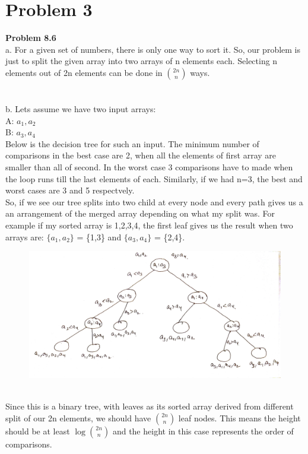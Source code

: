 \documentclass[10pt]{article}
\begin{document}
\section{Problem 3}
\textbf{Problem 8.6}\\
a. For a given set of numbers, there is only one way to sort it. So, our problem is just to split the given array into two arrays of n elements each. Selecting n elements out of 2n elements can be done in $2n\choose n$ ways.\\\\\\
b. Lets assume we have two input arrays: \\
A: $a_{1}, a_{2}$\\
B: $a_{3}, a_{4}$\\
Below is the decision tree for such an input. The minimum number of comparisons in the best case are 2, when all the elements of first array are smaller than all of second. In the worst case 3 comparisons have to made when the loop runs till the last elements of each. 
Similarly, if we had n=3, the best and worst cases are 3 and 5 respectvely.\\
So, if we see our tree splits into two child at every node and every path gives us a an arrangement of the merged array depending on what my split was. For example if my sorted array is 1,2,3,4, the first leaf gives us the result when two arrays are: $\{a_1,a_2\}$ = \{1,3\} and $\{a_3,a_4\}$ = \{2,4\}.\\
\begin{figure}[ht!]
\centering
\includegraphics[width=120mm]{decisionTree.jpg}
\end{figure}\\
Since this is a binary tree, with leaves as its sorted array derived from different split of our 2n elements, we should have $2n\choose n$ leaf nodes. This means the height should be at least $\log {2n\choose n}$ and the height in this case represents the order of comparisons.\\
\end{document}
